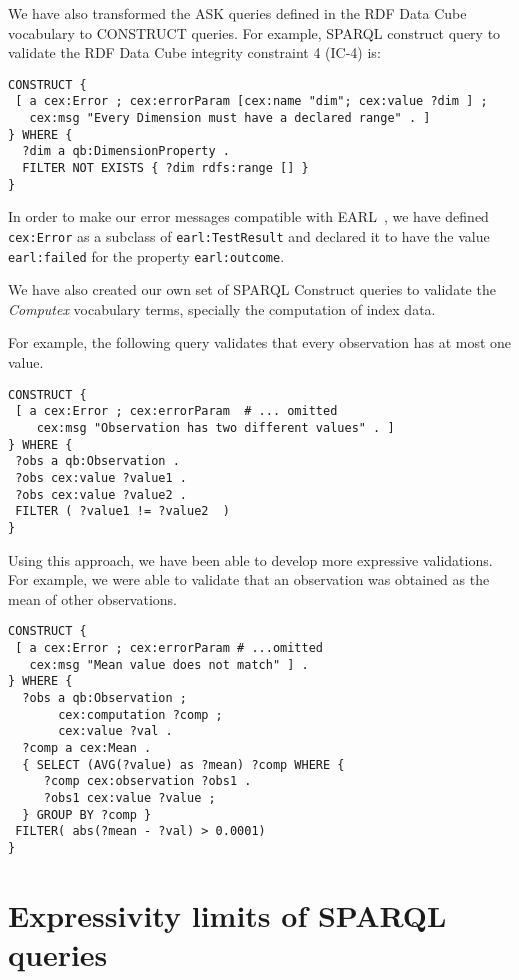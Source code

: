  We have also transformed the ASK queries defined in the RDF Data Cube
 vocabulary to CONSTRUCT queries. For example, SPARQL construct query to validate the RDF Data Cube integrity
 constraint 4 (IC-4) is:
 
\begin{lstlisting}[style=SPARQL]
CONSTRUCT {
 [ a cex:Error ; cex:errorParam [cex:name "dim"; cex:value ?dim ] ;
   cex:msg "Every Dimension must have a declared range" . ]
} WHERE {
  ?dim a qb:DimensionProperty .
  FILTER NOT EXISTS { ?dim rdfs:range [] }
}
\end{lstlisting}
 
In order to make our error messages compatible with EARL~\cite{EARL}, we have
 defined \lstinline|cex:Error| as a subclass of \lstinline|earl:TestResult| and 
 declared it to have the value \lstinline|earl:failed| for the property
 \lstinline|earl:outcome|.
 
We have also created our own set of SPARQL Construct queries to validate the
 \emph{Computex} vocabulary terms, specially the computation of index data.

For example, the following query validates that every observation 
  has at most one value.
 
\begin{lstlisting}[style=SPARQL]
CONSTRUCT {
 [ a cex:Error ; cex:errorParam  # ... omitted 
    cex:msg "Observation has two different values" . ]
} WHERE {
 ?obs a qb:Observation .
 ?obs cex:value ?value1 .
 ?obs cex:value ?value2 .
 FILTER ( ?value1 != ?value2  )
}
\end{lstlisting}

Using this approach, we have been able to develop more expressive validations.
For example, we were able to validate that an observation was obtained as the
mean of other observations. 

\begin{lstlisting}[style=SPARQL]
CONSTRUCT {
 [ a cex:Error ; cex:errorParam # ...omitted 
   cex:msg "Mean value does not match" ] .
} WHERE {  
  ?obs a qb:Observation ;
       cex:computation ?comp ;
       cex:value ?val .
  ?comp a cex:Mean .
  { SELECT (AVG(?value) as ?mean) ?comp WHERE {
     ?comp cex:observation ?obs1 .
	 ?obs1 cex:value ?value ;
  } GROUP BY ?comp } 
 FILTER( abs(?mean - ?val) > 0.0001)
}
\end{lstlisting}

\section{Expressivity limits of SPARQL queries}

